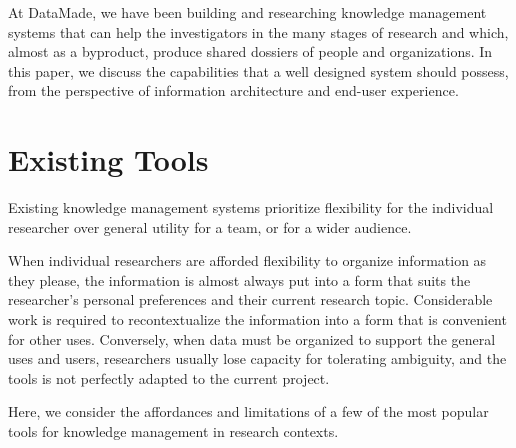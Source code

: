 \documentclass[format=siggraph, review=true]{acmart}
\begin{document}
At DataMade, we have been building and researching knowledge
management systems that can help the investigators in the many stages
of research and which, almost as a byproduct, produce shared dossiers
of people and organizations. In this paper, we discuss the
capabilities that a well designed system should possess, from the
perspective of information architecture and end-user experience.

\section{Existing Tools}
Existing knowledge management systems prioritize flexibility for the
individual researcher over general utility for a team, or for a wider
audience. 

When individual researchers are afforded flexibility to organize
information as they please, the information is almost always put into
a form that suits the researcher's personal preferences and their
current research topic. Considerable work is required to
recontextualize the information into a form that is convenient for
other uses. Conversely, when data must be organized to support the
general uses and users, researchers usually lose capacity for
tolerating ambiguity, and the tools is not perfectly adapted to the
current project.

Here, we consider the affordances and limitations of a few of the most
popular tools for knowledge management in research contexts.
\end{document}
